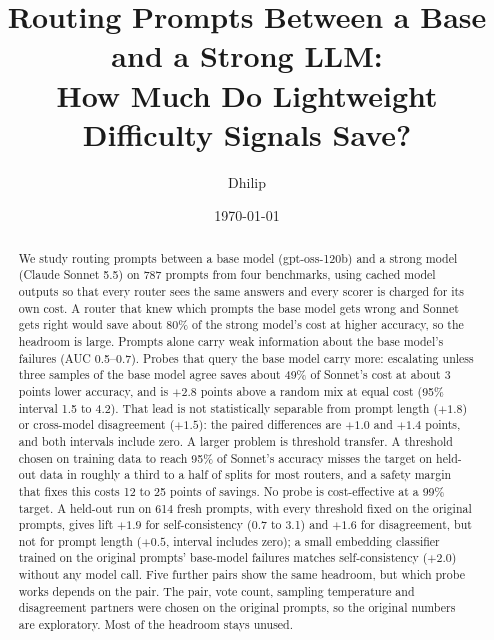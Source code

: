 \documentclass[11pt]{article}
\title{Routing Prompts Between a Base and a Strong LLM:\\ How Much Do Lightweight Difficulty Signals Save?}
\author{Dhilip}%
\date{\today}
\begin{document}
\maketitle

\begin{abstract}
We study routing prompts between a base model (gpt-oss-120b) and a strong model (Claude Sonnet 5.5) on 787 prompts from four benchmarks, using cached model outputs so that every router sees the same answers and every scorer is charged for its own cost. A router that knew which prompts the base model gets wrong and Sonnet gets right would save about 80\% of the strong model's cost at higher accuracy, so the headroom is large. Prompts alone carry weak information about the base model's failures (AUC 0.5--0.7). Probes that query the base model carry more: escalating unless three samples of the base model agree saves about 49\% of Sonnet's cost at about 3 points lower accuracy, and is $+2.8$ points above a random mix at equal cost (95\% interval 1.5 to 4.2). That lead is not statistically separable from prompt length ($+1.8$) or cross-model disagreement ($+1.5$): the paired differences are $+1.0$ and $+1.4$ points, and both intervals include zero. A larger problem is threshold transfer. A threshold chosen on training data to reach 95\% of Sonnet's accuracy misses the target on held-out data in roughly a third to a half of splits for most routers, and a safety margin that fixes this costs 12 to 25 points of savings. No probe is cost-effective at a 99\% target. A held-out run on 614 fresh prompts, with every threshold fixed on the original prompts, gives lift $+1.9$ for self-consistency (0.7 to 3.1) and $+1.6$ for disagreement, but not for prompt length ($+0.5$, interval includes zero); a small embedding classifier trained on the original prompts' base-model failures matches self-consistency ($+2.0$) without any model call. Five further pairs show the same headroom, but which probe works depends on the pair. The pair, vote count, sampling temperature and disagreement partners were chosen on the original prompts, so the original numbers are exploratory. Most of the headroom stays unused.
\end{abstract}
\end{document}
